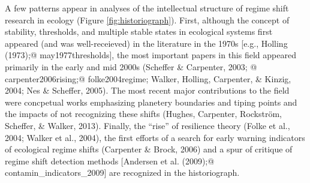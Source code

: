 \documentclass[12pt,twoside,openany]{reedthesis}
\begin{document}
A few patterns appear in analyses of the intellectual structure of regime shift research in ecology (Figure \ref{fig:historiograph}). First, although the concept of stability, thresholds, and multiple stable states in ecological systems first appeared (and was well-receieved) in the literature in the 1970s {[}e.g., Holling (1973);@ may1977thresholds{]}, the most important papers in this field appeared primarily in the early and mid 2000s (Scheffer \& Carpenter, 2003; @ carpenter2006rising;@ folke2004regime; Walker, Holling, Carpenter, \& Kinzig, 2004; Nes \& Scheffer, 2005). The most recent major contributions to the field were concpetual works emphasizing planetery boundaries and tiping points and the impacts of not recognizing these shifts (Hughes, Carpenter, Rockström, Scheffer, \& Walker, 2013). Finally, the ``rise'' of resilience theory (Folke et al., 2004; Walker et al., 2004), the first efforts of a search for early warning indicators of ecological regime shifts (Carpenter \& Brock, 2006) and a spur of critique of regime shift detection methods {[}Andersen et al. (2009);@ contamin\_indicators\_2009{]} are recognized in the historiograph.
\end{document}
